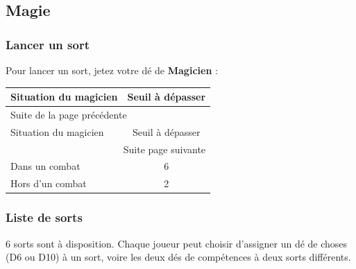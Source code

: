 \documentclass[a4paper, 11pt, twoside]{article}
\begin{document}
\subsection{Magie}
\label{sec:orgc9e4037}
\subsubsection{Lancer un sort}
\label{sec:org0141957}

Pour lancer un sort, jetez votre dé de \textbf{Magicien} :

\begin{longtable}{l|c}
Situation du magicien & Seuil à dépasser\\
\hline
\endfirsthead
\multicolumn{2}{l}{Suite de la page précédente} \\
\hline

Situation du magicien & Seuil à dépasser \\

\hline
\endhead
\hline\multicolumn{2}{r}{Suite page suivante} \\
\endfoot
\endlastfoot
\hline
Dans un combat & 6\\
Hors d'un combat & 2\\
\end{longtable}

\subsubsection{Liste de sorts}
\label{sec:org3b4130e}

6 sorts sont à disposition. Chaque joueur peut choisir d'assigner un dé de choses (D6 ou D10) à un sort, voire les deux dés de compétences à deux sorts différents.

\newpage
\end{document}
